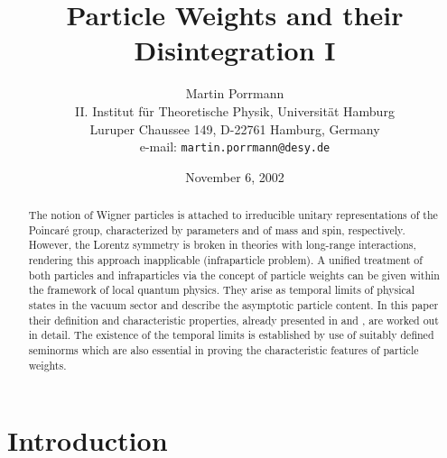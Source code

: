\documentclass[a4paper,a4paper]{article}
\numberwithin{equation}{section}
\theoremstyle{definition}
\theoremstyle{plain}
\theoremstyle{remark}
\begin{document}
%
\title{Particle Weights and their Disintegration I}
\author{Martin Porrmann\\
  II. Institut f\"ur Theoretische Physik, Universit\"at Hamburg\\
  Luruper Chaussee 149, D-22761 Hamburg, Germany\\
  e-mail: \texttt{martin.porrmann@desy.de}}
\date{November 6, 2002}

\maketitle

%
\begin{abstract}
  The notion of Wigner particles is attached to irreducible unitary
  representations of the Poincar\'e group, characterized by parameters
  \coordHE{} and \coordHE{} of mass and spin, respectively. However, the Lorentz
  symmetry is broken in theories with long-range interactions,
  rendering this approach inapplicable (infraparticle problem). A
  unified treatment of both particles and infraparticles via the
  concept of particle weights can be given within the framework of
  local quantum physics. They arise as temporal limits of physical
  states in the vacuum sector and describe the asymptotic particle
  content. In this paper their definition and characteristic
  properties, already presented in \cite{buchholz/porrmann/stein:1991}
  and \cite{haag:1996}, are worked out in detail. The existence of the
  temporal limits is established by use of suitably defined seminorms
  which are also essential in proving the characteristic features of
  particle weights.
\end{abstract}



\section{Introduction}
  \label{sec:introduction}
  
\end{document}
